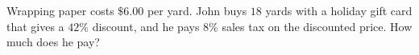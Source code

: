 Wrapping paper costs $\$6.00$ per yard. John buys $18$ yards with a holiday gift card that gives a $42\%$ discount, and he pays $8\%$ sales tax on the discounted price. How much does he pay?
